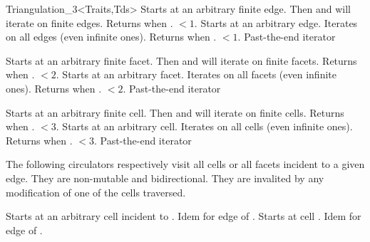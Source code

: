 \begin{ccClassTemplate}{Triangulation_3<Traits,Tds>}
{Starts at an arbitrary finite edge. Then \ccc{++} and \ccc{--} will
iterate on finite edges. Returns  when
\ccVar. $<1$.} 
\ccGlue
{}
{Starts at an arbitrary edge. Iterates on all edges (even infinite
ones). Returns  when \ccVar. $<1$.}
\ccGlue
{}
{Past-the-end iterator}

{Starts at an arbitrary finite facet. Then \ccc{++} and \ccc{--} will
iterate on finite facets. Returns  when
\ccVar. $<2$.}
\ccGlue
{}
{Starts at an arbitrary facet. Iterates on all facets (even infinite
ones). Returns  when 
\ccVar. $<2$.}
\ccGlue
{}
{Past-the-end iterator}

{Starts at an arbitrary finite cell. Then \ccc{++} and \ccc{--} will
iterate on finite cells. Returns  when
\ccVar. $<3$.}
\ccGlue
{}
{Starts at an arbitrary cell. Iterates on all cells (even infinite
ones). Returns  when 
\ccVar. $<3$.}
\ccGlue
{}
{Past-the-end iterator}


The following circulators respectively visit all cells or all facets
incident to a given edge. They are non-mutable and bidirectional. They
are invalited by any modification of one of the cells traversed. 

{Starts at an arbitrary cell incident to .
}
\ccGlue
{}
{Idem for edge  of .}
\ccGlue
{}
{Starts at cell .
}
\ccGlue
{}
{Idem for edge  of .}


\end{ccClassTemplate}
